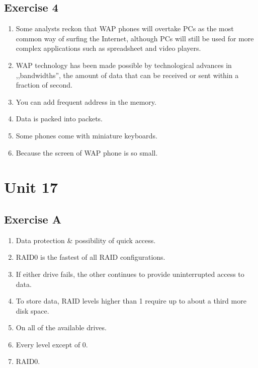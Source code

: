 \documentclass[a5paper,10pt,notitlepage,pdftex,headsepline]{scrartcl}
\begin{document}
  \subsection{Exercise 4}
    \begin{enumerate}
      \item Some analysts reckon that WAP phones will overtake PCs as the most
        common way of surfing the Internet, although PCs will still be used for
        more complex applications such as spreadsheet and video players.
      \item WAP technology has been made possible by technological advances in
        ,,bandwidths'', the amount of data that can be received or sent within a
        fraction of second.
      \item You can add frequent address in the memory.
      \item Data is packed into packets.
      \item Some phones come with miniature keyboards.
      \item Because the screen of WAP phone is so small.
    \end{enumerate}
\section{Unit 17}
  \subsection{Exercise A}
    \begin{enumerate}
      \item Data protection \& possibility of quick access.
      \item RAID0 is the fastest of all RAID configurations.
      \item If either drive fails, the other continues to provide
        uninterrupted access to data.
      \item To store data, RAID levels higher than 1 require up to about a
        third more disk space.
      \item On all of the available drives.
      \item Every level except of 0.
      \item RAID0.
    \end{enumerate}
\end{document}
